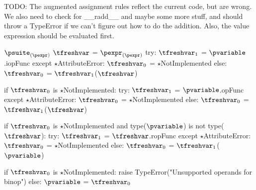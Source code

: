 \documentclass{article}
\begin{document}
\begin{mathpar}
\end{mathpar}

TODO: The augmented assignment rules reflect the current code, but are wrong.
We also need to check for \_\_radd\_\_ and maybe some more stuff, and should throw a
TypeError if we can't figure out how to do the addition. Also, the value
expression should be evaluated first.
\newsavebox{\augmentedAssignmentBox}
\begin{lrbox}{\augmentedAssignmentBox}
\begin{python}
$\psuite_{(\pexpr)}$
$\tfreshvar$ = $\pexpr_{(\pexpr)}$
try:
  $\tfreshvar_1$ = $\pvariable$.iopFunc
except $\star$AttributeError:
  $\tfreshvar_0$ = $\star$NotImplemented
else:
  $\tfreshvar_0$ = $\tfreshvar_1$($\tfreshvar$)

if $\tfreshvar_0$ is $\star$NotImplemented:
  try:
    $\tfreshvar_1$ = $\pvariable$.opFunc
  except $\star$AttributeError:
    $\tfreshvar_0$ = $\star$NotImplemented
  else:
    $\tfreshvar_0$ = $\tfreshvar_1$($\tfreshvar$)

if $\tfreshvar_0$ is $\star$NotImplemented and
  type($\pvariable$) is not type($\tfreshvar$):
  try:
    $\tfreshvar_1$ = $\tfreshvar$.ropFunc
  except $\star$AttributeError:
    $\tfreshvar_0$ = $\star$NotImplemented
  else:
    $\tfreshvar_0$ = $\tfreshvar_1$($\pvariable$)

if $\tfreshvar_0$ is $\star$NotImplemented:
  raise TypeError("Unsupported operands for binop")
else:
  $\pvariable$ = $\tfreshvar_0$
\end{python}
\end{lrbox}

\begin{mathpar}
\end{mathpar}
\end{document}
